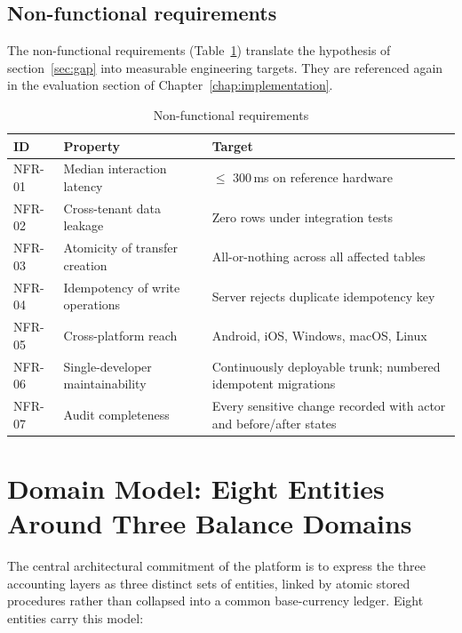 \subsection{Non-functional requirements}
\label{ssec:nonfunc}

The non-functional requirements (Table~\ref{tab:nonfunc}) translate the hypothesis of section~\ref{sec:gap} into measurable engineering targets. They are referenced again in the evaluation section of Chapter~\ref{chap:implementation}.

{\singlespacing
\begin{table}[h]
  \caption{Non-functional requirements}
  \label{tab:nonfunc}
  \centering
  \begin{tabular}{p{1.3cm}p{6cm}p{6cm}}
    \toprule
    \textbf{ID}  & \textbf{Property}        & \textbf{Target}\\
    \midrule
    NFR-01 & Median interaction latency      & $\leq$ 300\,ms on reference hardware\\
    NFR-02 & Cross-tenant data leakage       & Zero rows under integration tests\\
    NFR-03 & Atomicity of transfer creation  & All-or-nothing across all affected tables\\
    NFR-04 & Idempotency of write operations & Server rejects duplicate idempotency key\\
    NFR-05 & Cross-platform reach            & Android, iOS, Windows, macOS, Linux\\
    NFR-06 & Single-developer maintainability & Continuously deployable trunk; numbered idempotent migrations\\
    NFR-07 & Audit completeness              & Every sensitive change recorded with actor and before/after states\\
    \bottomrule
  \end{tabular}
\end{table}
}

\section{Domain Model: Eight Entities Around Three Balance Domains}
\label{sec:domainmodel}

The central architectural commitment of the platform is to express the three accounting layers as three distinct sets of entities, linked by atomic stored procedures rather than collapsed into a common base-currency ledger. Eight entities carry this model:

